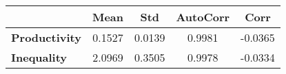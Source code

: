 \begin{tiny}\begin{tabular}{|l|c|c|c|c|}
\hline
&\textbf{Mean}&\textbf{Std}&\textbf{AutoCorr}&\textbf{Corr}\\\hline
\textbf{Productivity}&0.1527&0.0139&0.9981&-0.0365\\\hline
\textbf{Inequality}&2.0969&0.3505&0.9978&-0.0334\\\hline
\end{tabular}
\end{tiny}